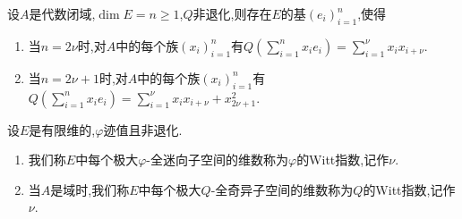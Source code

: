 \begin{corollary}{}{}
	设$A$是代数闭域,$\dim E=n\geq 1$,$Q$非退化,则存在$E$的基$\left(e_{i}\right)_{i=1}^{n}$,使得
	\begin{enumerate}
		\item 当$n=2\nu$时,对$A$中的每个族$\left(x_{i}\right)_{i=1}^{n}$有$Q\left(\sum\limits_{i=1}^{n}x_{i}e_{i}\right)=\sum\limits_{i=1}^{\nu}x_{i}x_{i+\nu}$.
		\item 当$n=2\nu+1$时,对$A$中的每个族$\left(x_{i}\right)_{i=1}^{n}$有$Q\left(\sum\limits_{i=1}^{n}x_{i}e_{i}\right)=\sum\limits_{i=1}^{\nu}x_{i}x_{i+\nu}+x_{2\nu +1}^{2}$.
	\end{enumerate}
\end{corollary}

\begin{definition}{}{}
	设$E$是有限维的,$\varphi$迹值且非退化.
	\begin{enumerate}
		\item 我们称$E$中每个极大$\varphi$-全迷向子空间的维数称为$\varphi$的Witt指数,记作$\nu$.
		\item 当$A$是域时,我们称$E$中每个极大$Q$-全奇异子空间的维数称为$Q$的Witt指数,记作$\nu$.
	\end{enumerate}
\end{definition}


